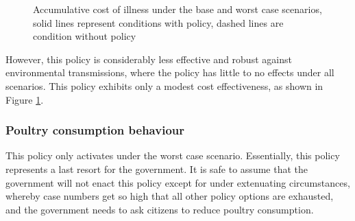 \begin{figure}[h!]
\begin{minipage}{0.45\textwidth}
        \caption{Accumulative cost of illness under the base and worst case scenarios, solid lines represent conditions with policy, dashed lines are condition without policy}
        \label{fig:fs_bwc_acoi}
    \end{minipage}
\end{figure}

However, this policy is considerably less effective and robust against environmental transmissions, where the policy has little to no effects under all scenarios. This policy exhibits only a modest cost effectiveness, as shown in Figure \ref{fig:fs_bwc_acoi}. %


\subsubsection{Poultry consumption behaviour}
\label{sec: consumption behaviour}

This policy only activates under the worst case scenario. Essentially, this policy represents a last resort for the government. It is safe to assume that the government will not enact this policy except for under extenuating circumstances, whereby case numbers get so high that all other policy options are exhausted, and the government needs to ask citizens to reduce poultry consumption.

